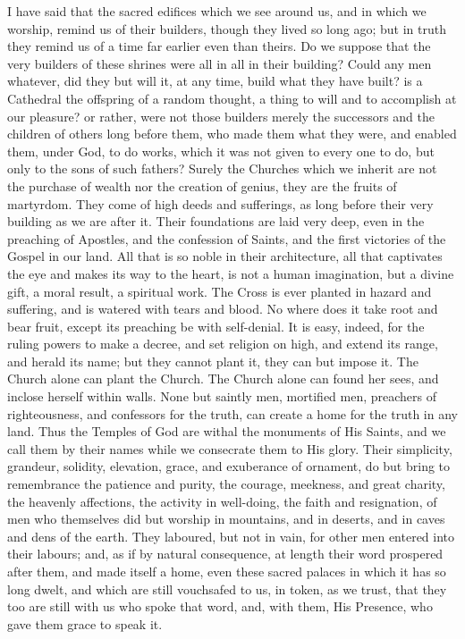 I have said that the sacred edifices which we see around us, and in
which we worship, remind us of their builders, though they lived so
long ago; but in truth they remind us of a time far earlier even than
theirs. Do we suppose that the very builders of these shrines were all
in all in their building? Could any men whatever, did they but will
it, at any time, build what they have built? is a Cathedral the
offspring of a random thought, a thing to will and to accomplish at
our pleasure? or rather, were not those builders merely the successors
and the children of others long before them, who made them what they
were, and enabled them, under God, to do works, which it was not given
to every one to do, but only to the sons of such fathers? Surely the
Churches which we inherit are not the purchase of wealth nor the
creation of genius, they are the fruits of martyrdom. They come of
high deeds and sufferings, as long before their very building as we
are after it. Their foundations are laid very deep, even in the
preaching of Apostles, and the confession of Saints, and the first
victories of the Gospel in our land. All that is so noble in their
architecture, all that captivates the eye and makes its way to the
heart, is not a human imagination, but a divine gift, a moral result,
a spiritual work. The Cross is ever planted in hazard and suffering,
and is watered with tears and blood. No where does it take root and
bear fruit, except its preaching be with self-denial. It is easy,
indeed, for the ruling powers to make a decree, and set religion on
high, and extend its range, and herald its name; but they cannot plant
it, they can but impose it. The Church alone can plant the Church. The
Church alone can found her sees, and inclose herself within walls.
None but saintly men, mortified men, preachers of righteousness, and
confessors for the truth, can create a home for the truth in any land.
Thus the Temples of God are withal the monuments of His Saints, and we
call them by their names while we consecrate them to His glory. Their
simplicity, grandeur, solidity, elevation, grace, and exuberance of
ornament, do but bring to remembrance the patience and purity, the
courage, meekness, and great charity, the heavenly affections, the
activity in well-doing, the faith and resignation, of men who
themselves did but worship in mountains, and in deserts, and in caves
and dens of the earth. They laboured, but not in vain, for other men
entered into their labours; and, as if by natural consequence, at
length their word prospered after them, and made itself a home, even
these sacred palaces in which it has so long dwelt, and which are
still vouchsafed to us, in token, as we trust, that they too are still
with us who spoke that word, and, with them, His Presence, who gave
them grace to speak it.

